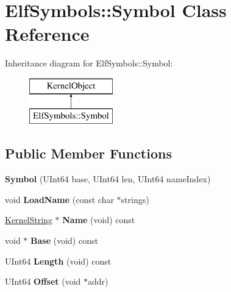 \hypertarget{class_elf_symbols_1_1_symbol}{}\section{Elf\+Symbols\+:\+:Symbol Class Reference}
\label{class_elf_symbols_1_1_symbol}
Inheritance diagram for Elf\+Symbols\+:\+:Symbol\+:\begin{figure}[H]
\begin{center}
\leavevmode
\includegraphics[height=2.000000cm]{class_elf_symbols_1_1_symbol}
\end{center}
\end{figure}
\subsection*{Public Member Functions}
\begin{DoxyCompactItemize}
\item 
\mbox{\label{class_elf_symbols_1_1_symbol_a25bc6d5988d0814f00250ac791a14f54}} 
{\bfseries Symbol} (U\+Int64 base, U\+Int64 len, U\+Int64 name\+Index)
\item 
\mbox{\label{class_elf_symbols_1_1_symbol_aaa9784cc7572ee03786049090b70e936}} 
void {\bfseries Load\+Name} (const char $\ast$strings)
\item 
\mbox{\label{class_elf_symbols_1_1_symbol_aa33670147a4bb7c064ce0086b7c1750c}} 
\hyperlink{class_kernel_string}{Kernel\+String} $\ast$ {\bfseries Name} (void) const
\item 
\mbox{\label{class_elf_symbols_1_1_symbol_aab069432a7baeb72f4e6560436939799}} 
void $\ast$ {\bfseries Base} (void) const
\item 
\mbox{\label{class_elf_symbols_1_1_symbol_acefd77b0321a5b9082eb53f7ef249ec5}} 
U\+Int64 {\bfseries Length} (void) const
\item 
\mbox{\label{class_elf_symbols_1_1_symbol_a8731469ac067e640068f8a0d7904d52d}} 
U\+Int64 {\bfseries Offset} (void $\ast$addr)
\end{DoxyCompactItemize}
